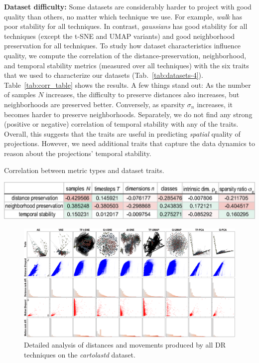 \noindent\textbf{Dataset difficulty:} Some datasets are considerably harder to project with good quality than others, no matter which technique we use. For example, \emph{walk} has poor stability for all techniques. In contrast, \emph{gaussians} has good stability for all techniques (except the t-SNE and UMAP variants) and good neighborhood preservation for all techniques. To study how dataset characteristics influence quality, we compute the correlation of the distance-preservation, neighborhood, and temporal stability metrics (measured over all techniques) with the six traits that we used to characterize our datasets (Tab.~\ref{tab:datasets-4}). Table~\ref{tab:corr_table} shows the results. A few things stand out: As the number of samples $N$ increases, the difficulty to preserve distances also increases, but neighborhoods are preserved better. Conversely, as sparsity $\sigma_n$ increases, it becomes harder to preserve neighborhoods. Separately, we do not find any strong (positive or negative) correlation of temporal stability with any of the traits. Overall, this suggests that the traits are useful in predicting \emph{spatial} quality of projections. However, we need additional traits that capture the data dynamics to reason about the projections' temporal stability.

\begin{table}[tb]
\centering
\caption{Correlation between metric types and dataset traits.}
\label{tab:corr_table}
\includegraphics[width=1.01\linewidth]{figures/projection-evaluation/corr_table.eps}
\end{table}

\begin{figure}[tb]\centering
\hspace*{-0.02\linewidth}
  \includegraphics[width=1.0\linewidth]{figures/projection-evaluation/detailed_cartolastd.pdf}
  \caption{Detailed analysis of distances and movements produced by all DR techniques on the \emph{cartolastd} dataset.}
  \vspace{-0.15cm}
  \label{fig:trails_cartolastd}
\end{figure}


